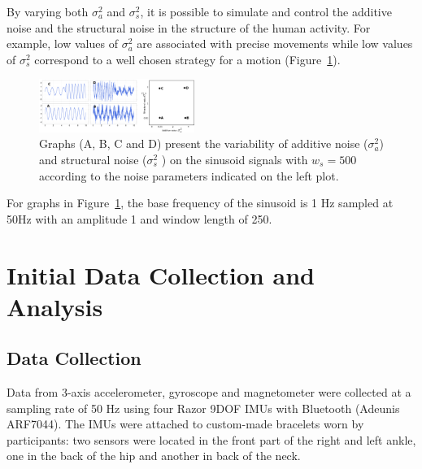 \documentclass[10pt,journal,compsoc]{IEEEtran}
\begin{document}
By varying both $\sigma_a ^2$ and $\sigma_s ^2$, 
it is possible to simulate and control the additive noise and the structural noise 
in the structure of the human activity. For example, low values of $\sigma_a ^2$ 
are associated with precise movements while low values of $\sigma_s ^2$ correspond 
to a well chosen strategy for a motion (Figure~\ref{fig:sn}).


\begin{figure}[!htb]
\centering    
\includegraphics[width=0.45\textwidth]{impactofnoise01}
\caption[PA]{Graphs (A, B, C and D) present the variability of additive noise 
($\sigma_a ^2$) and structural noise ($\sigma_s ^2$ ) on the sinusoid signals with $w_s=500$ 
according to the noise parameters indicated on the left plot.}
\label{fig:sn}
\end{figure}

For graphs in Figure~\ref{fig:sn}, the base frequency of the sinusoid is 1 Hz sampled at 
50Hz with an amplitude 1 and window length of 250.


% 

\section{Initial Data Collection and Analysis}

\subsection{Data Collection}
Data from 3-axis accelerometer, gyroscope and magnetometer 
were collected at a sampling rate of 50 Hz using four Razor 
9DOF IMUs with Bluetooth (Adeunis ARF7044). The IMUs were 
attached to custom-made bracelets worn by participants: 
two sensors were located in the front part of the right 
and left ankle, one in the back of the hip and 
another in back of the neck.
\end{document}

